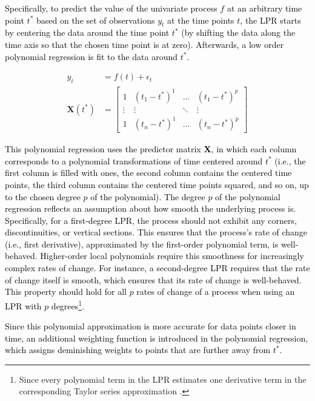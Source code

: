 \documentclass[man, floatsintext]{apa7}
\begin{document}
\textcolor{black}{
  Specifically, to predict the value of the univariate process $f$ at an
  arbitrary time point $t^*$ based on the set of observations $y_t$ at the time
  points $t$, the LPR starts by centering the data around the time point $t^*$
  (by shifting the data along the time axis so that the chosen time point is at
  zero). Afterwards, a low order polynomial regression is fit to the data
  around $t^*$.
}

\begin{align}
  y_t             & = f(t) + \epsilon_t \\
  \textbf{X}(t^*) & =
  \begin{bmatrix}
    1      & (t_1 - t^*)^1 & \dots  & (t_1 - t^*)^p \\
    \vdots & \vdots        & \ddots & \vdots        \\
    1      & (t_n - t^*)^1 & \dots  & (t_n - t^*)^p
  \end{bmatrix}
  \label{eq:lpr_equations_mod_mat}
\end{align}

\noindent\textcolor{black}{
  This polynomial regression uses the predictor matrix $\textbf{X}$, in which
  each column corresponds to a polynomial transformations of time centered
  around $t^*$ (i.e., the first column is filled with ones, the second column
  contains the centered time points, the third column contains the centered
  time points squared, and so on, up to the chosen degree $p$ of the
  polynomial). The degree $p$ of the polynomial regression reflects an
  assumption about how smooth the underlying process is. Specifically, for a
  first-degree LPR, the process should not exhibit any corners,
  discontinuities, or vertical sections. This ensures that the process's rate
  of change (i.e., first derivative), approximated by the first-order
  polynomial term, is well-behaved. Higher-order local polynomials require this
  smoothness for increasingly complex rates of change. For instance, a
  second-degree LPR requires that the rate of change itself is smooth, which
  ensures that its rate of change is well-behaved. This property should hold
  for all $p$ rates of change of a process when using an LPR with $p$
  degrees\footnote{Since every polynomial term in the LPR estimates one
    derivative term in the corresponding Taylor series approximation
    \parencite{avery_literature_nodate}.}.
}

\textcolor{black}{
  Since this polynomial approximation is more accurate for data points closer
  in time, an additional weighting function is introduced in the polynomial
  regression, which assigns deminishing weights to points that are further away
  from $t^*$.
}
\end{document}
